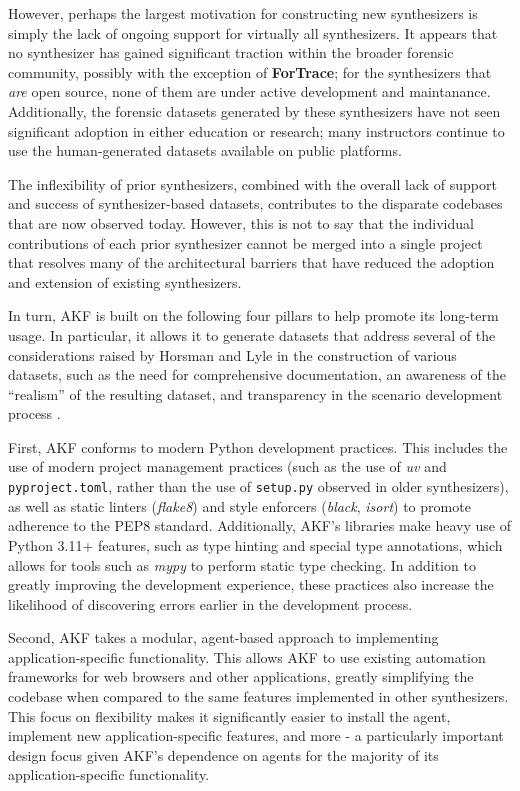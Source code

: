\documentclass[letterpaper,12pt]{report}
\newcommand{\passthrough}[1]{#1}
\begin{document}
However, perhaps the largest motivation for constructing new
synthesizers is simply the lack of ongoing support for virtually all
synthesizers. It appears that no synthesizer has gained significant
traction within the broader forensic community, possibly with the
exception of \textbf{ForTrace}; for the synthesizers that \emph{are}
open source, none of them are under active development and maintanance.
Additionally, the forensic datasets generated by these synthesizers have
not seen significant adoption in either education or research; many
instructors continue to use the human-generated datasets available on
public platforms.

The inflexibility of prior synthesizers, combined with the overall lack
of support and success of synthesizer-based datasets, contributes to the
disparate codebases that are now observed today. However, this is not to
say that the individual contributions of each prior synthesizer cannot
be merged into a single project that resolves many of the architectural
barriers that have reduced the adoption and extension of existing
synthesizers.

In turn, AKF is built on the following four pillars to help promote its
long-term usage. In particular, it allows it to generate datasets that
address several of the considerations raised by Horsman and Lyle in the
construction of various datasets, such as the need for comprehensive
documentation, an awareness of the ``realism'' of the resulting dataset,
and transparency in the scenario development process
\cite{horsmanDatasetConstructionChallenges2021}.

First, AKF conforms to modern Python development practices. This
includes the use of modern project management practices (such as the use
of \emph{uv} and \passthrough{\lstinline!pyproject.toml!}, rather than
the use of \passthrough{\lstinline!setup.py!} observed in older
synthesizers), as well as static linters (\emph{flake8}) and style
enforcers (\emph{black}, \emph{isort}) to promote adherence to the PEP8
standard. Additionally, AKF's libraries make heavy use of Python 3.11+
features, such as type hinting and special type annotations, which
allows for tools such as \emph{mypy} to perform static type checking. In
addition to greatly improving the development experience, these
practices also increase the likelihood of discovering errors earlier in
the development process.

Second, AKF takes a modular, agent-based approach to implementing
application-specific functionality. This allows AKF to use existing
automation frameworks for web browsers and other applications, greatly
simplifying the codebase when compared to the same features implemented
in other synthesizers. This focus on flexibility makes it significantly
easier to install the agent, implement new application-specific
features, and more - a particularly important design focus given AKF's
dependence on agents for the majority of its application-specific
functionality.
\end{document}
